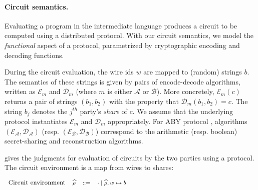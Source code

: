 \paragraph{Circuit semantics.} Evaluating a program in the
intermediate language produces a
circuit to be computed using a distributed \mpc protocol. With
our circuit semantics, we model the \emph{functional} aspect
of a \mpc protocol, parametrized by cryptographic encoding and
decoding functions.

During the circuit evaluation, the wire ids $w$ are
mapped to (random) strings $b$. The semantics of these strings is
given by pairs of encode-decode algorithms, written as
$\mathcal{E}_{m}$ and $\mathcal{D}_{m}$ (where $m$ is either
$\mathcal{A}$ or $\mathcal{B}$). 
More concretely,
$\mathcal{E}_{m}(c)$ returns a pair of strings $(b_{1}, b_{2})$
 with the property that
$\mathcal{D}_{m}(b_{1}, b_{2}) = c$. 
The string $b_j$ denotes the $j^{th}$ party's {\it share} of $c$.
We assume that the underlying \mpc
protocol instantiates $\mathcal{E}_{m}$ and $\mathcal{D}_{m}$
appropriately. For ABY protocol \cite{aby}, algorithms
$(\mathcal{E}_{\mathcal{A}},\mathcal{D}_{\mathcal{A}})$
(resp. $(\mathcal{E}_{\mathcal{B}},\mathcal{D}_{\mathcal{B}})$)
correspond to the arithmetic (resp. boolean) secret-sharing and
reconstruction algorithms.


 gives the judgments for evaluation of circuits by
the two parties using a \mpc protocol. The circuit environment  is a
map from wires to shares:

\vspace{0.2cm}
$
\footnotesize
\begin{array}{rrcl}
    \text{\small{Circuit environment}} & \widehat\rho &::=& \cdot \mid \widehat\rho,w \mapsto b\\
\end{array}
$
\vspace{0.2cm}

